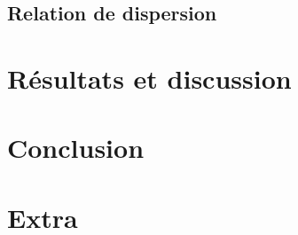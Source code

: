\documentclass[10pt,letterpaper,twocolumn]{article}
\begin{document}
\subsection{Relation de dispersion}


\section{Résultats et discussion}\label{sec:resultats} %


\section{Conclusion}\label{sec:conclusion} %

\section{Extra} %

\printbibliography
% 
%
\end{document}
